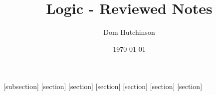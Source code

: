 \documentclass[11pt,a4paper]{article}
\begin{document}
\pagestyle{fancy}
\setlength\parindent{0pt}
\allowdisplaybreaks

\renewcommand{\headrulewidth}{0pt}


\title{Logic - Reviewed Notes}
\author{Dom Hutchinson}
\date{\today}
\maketitle

\fancyhead[R]{\today}

[subsection]
[section]
[section]
[section]
[section]
[section]
[section]

\newcommand{\dotprod}[0]{\boldsymbol{\cdot}}
\newcommand{\cosech}[0]{\mathrm{cosech}\ }
\newcommand{\cosec}[0]{\mathrm{cosec}\ }
\newcommand{\sech}[0]{\mathrm{sech}\ }
\newcommand{\prob}[0]{\mathbb{P}}
\newcommand{\nats}[0]{\mathbb{N}}
\newcommand{\cov}[0]{\mathrm{Cov}}
\newcommand{\var}[0]{\mathrm{Var}}
\newcommand{\expect}[0]{\mathbb{E}}
\newcommand{\reals}[0]{\mathbb{R}}
\newcommand{\integers}[0]{\mathbb{Z}}
\newcommand{\indicator}[0]{\mathds{1}}
\newcommand{\nb}[0]{\textit{N.B.} }
\newcommand{\ie}[0]{\textit{i.e.} }
\newcommand{\eg}[0]{\textit{e.g.} }
\newcommand{\X}[0]{\textbf{X}}
\newcommand{\x}[0]{\textbf{x}}
\newcommand{\iid}[0]{\overset{\text{iid}}{\sim}}
\newcommand{\proved}[0]{$\hfill\square$\\}
\newcommand{\LL}[0]{\mathcal{L}}
\newcommand{\M}[0]{\mathfrak{M}}
\newcommand{\I}[0]{\mathfrak{I}}
\end{document}

